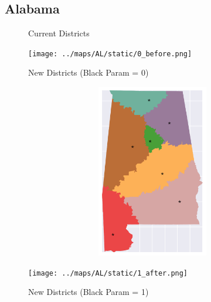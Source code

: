 \subsection{Alabama}
\begin{figure}[htb!] \centering
\caption{ Current Districts }
\texttt{[image: ../maps/AL/static/0\_before.png]}
\caption{ New Districts (Black Param = 0) }
\includegraphics[width=5in,height=3in,keepaspectratio]{../maps/AL/static/0_after.png}
\caption{ New Districts (Black Param = 1) }
\texttt{[image: ../maps/AL/static/1\_after.png]}
\end{figure}

\clearpage
\newpage

